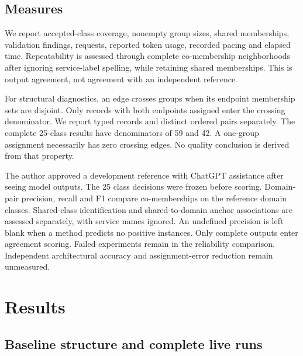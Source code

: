 \subsection{Measures}

We report accepted-class coverage, nonempty group sizes, shared memberships, validation findings, requests, reported token usage, recorded pacing and elapsed time. Repeatability is assessed through complete co-membership neighborhoods after ignoring service-label spelling, while retaining shared memberships. This is output agreement, not agreement with an independent reference.

For structural diagnostics, an edge crosses groups when its endpoint membership sets are disjoint. Only records with both endpoints assigned enter the crossing denominator. We report typed records and distinct ordered pairs separately. The complete 25-class results have denominators of 59 and 42. A one-group assignment necessarily has zero crossing edges. No quality conclusion is derived from that property.

The author approved a development reference with ChatGPT assistance after seeing model outputs. The 25 class decisions were frozen before scoring. Domain-pair precision, recall and F1 compare co-memberships on the reference domain classes. Shared-class identification and shared-to-domain anchor associations are assessed separately, with service names ignored. An undefined precision is left blank when a method predicts no positive instances. Only complete outputs enter agreement scoring. Failed experiments remain in the reliability comparison. Independent architectural accuracy and assignment-error reduction remain unmeasured.

\section{Results}

\subsection{Baseline structure and complete live runs}

